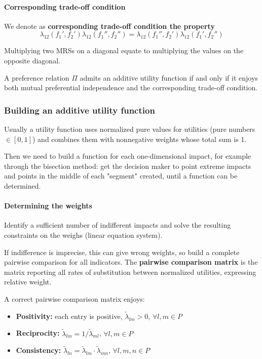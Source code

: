 \paragraph{Corresponding trade-off condition} We denote as \textbf{corresponding trade-off condition the property}
$$ \lambda_{12} (f_1', f_2') \lambda_{12} (f_1'', f_2'') = \lambda_{12} (f_1'', f_2') \lambda_{12} (f_1', f_2'')$$

Multiplying two MRSs on a diagonal equate to multiplying the values on the opposite diagonal.

A preference relation $\Pi$ admits an additive utility function if and only if it enjoys both mutual preferential independence and the corresponding trade-off condition.

\subsubsection{Building an additive utility function}

Usually a utility function uses normalized pure values for utilities (pure numbers $\in [0,1]$) and combines them with nonnegative weights whose total sum is 1. 

Then we need to build a function for each one-dimensional impact, for example through the bisection method: get the decision maker to point extreme impacts and points in the middle of each "segment" created, until a function can be determined.

\paragraph{Determining the weights} Identify a sufficient number of indifferent impacts and solve the resulting constraints on the weighs (linear equation system).

If indifference is imprecise, this can give wrong weights, so build a complete pairwise comparison for all indicators. The \textbf{pairwise comparison matrix} is the matrix reporting all rates of substitution between normalized utilities, expressing relative weight. 

A correct pairwise comparison matrix enjoys: 
\begin{itemize}
	\item \textbf{Positivity:} each entry is positive, $\tilde \lambda_{lm} > 0$, $\forall l,m \in P$
	
	\item \textbf{Reciprocity:} $\tilde \lambda_{lm} = 1/ \tilde \lambda_{ml}$, $\forall l,m \in P$
	
	\item \textbf{Consistency:} $\tilde \lambda_{ln} = \tilde \lambda_{lm} \cdot \tilde \lambda_{mn}$, $\forall l,m,n \in P$
\end{itemize}

